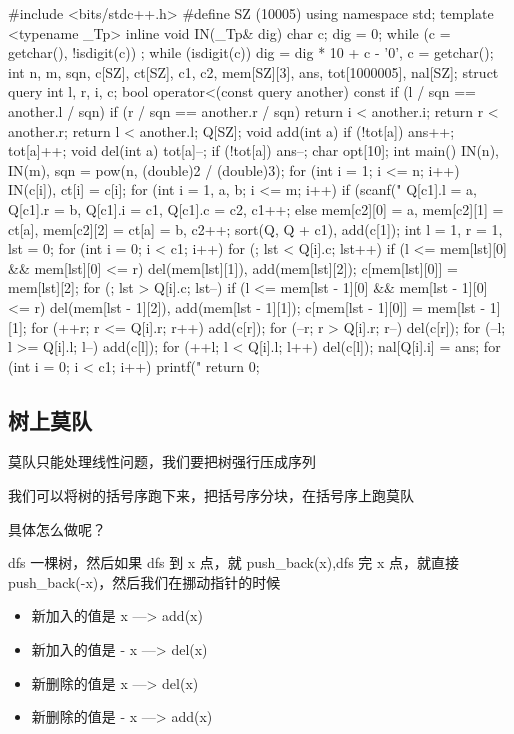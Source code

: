 \begin{cppcode}
#include <bits/stdc++.h>
#define SZ (10005)
using namespace std;
template <typename _Tp>
inline void IN(_Tp& dig) {
  char c;
  dig = 0;
  while (c = getchar(), !isdigit(c))
    ;
  while (isdigit(c)) dig = dig * 10 + c - '0', c = getchar();
}
int n, m, sqn, c[SZ], ct[SZ], c1, c2, mem[SZ][3], ans, tot[1000005], nal[SZ];
struct query {
  int l, r, i, c;
  bool operator<(const query another) const {
    if (l / sqn == another.l / sqn) {
      if (r / sqn == another.r / sqn) return i < another.i;
      return r < another.r;
    }
    return l < another.l;
  }
} Q[SZ];
void add(int a) {
  if (!tot[a]) ans++;
  tot[a]++;
}
void del(int a) {
  tot[a]--;
  if (!tot[a]) ans--;
}
char opt[10];
int main() {
  IN(n), IN(m), sqn = pow(n, (double)2 / (double)3);
  for (int i = 1; i <= n; i++) IN(c[i]), ct[i] = c[i];
  for (int i = 1, a, b; i <= m; i++)
    if (scanf("%
      Q[c1].l = a, Q[c1].r = b, Q[c1].i = c1, Q[c1].c = c2, c1++;
    else
      mem[c2][0] = a, mem[c2][1] = ct[a], mem[c2][2] = ct[a] = b, c2++;
  sort(Q, Q + c1), add(c[1]);
  int l = 1, r = 1, lst = 0;
  for (int i = 0; i < c1; i++) {
    for (; lst < Q[i].c; lst++) {
      if (l <= mem[lst][0] && mem[lst][0] <= r)
        del(mem[lst][1]), add(mem[lst][2]);
      c[mem[lst][0]] = mem[lst][2];
    }
    for (; lst > Q[i].c; lst--) {
      if (l <= mem[lst - 1][0] && mem[lst - 1][0] <= r)
        del(mem[lst - 1][2]), add(mem[lst - 1][1]);
      c[mem[lst - 1][0]] = mem[lst - 1][1];
    }
    for (++r; r <= Q[i].r; r++) add(c[r]);
    for (--r; r > Q[i].r; r--) del(c[r]);
    for (--l; l >= Q[i].l; l--) add(c[l]);
    for (++l; l < Q[i].l; l++) del(c[l]);
    nal[Q[i].i] = ans;
  }
  for (int i = 0; i < c1; i++) printf("%
  return 0;
}
\end{cppcode}

\subsection{树上莫队}

莫队只能处理线性问题，我们要把树强行压成序列

我们可以将树的括号序跑下来，把括号序分块，在括号序上跑莫队

具体怎么做呢？

dfs 一棵树，然后如果 dfs 到 x 点，就 push\_back(x),dfs 完 x 点，就直接 push\_back(-x)，然后我们在挪动指针的时候

\begin{itemize}
\item 新加入的值是 x  ---> add(x)
\item 新加入的值是 - x ---> del(x)
\item 新删除的值是 x  ---> del(x)
\item 新删除的值是 - x ---> add(x)
\end{itemize}

